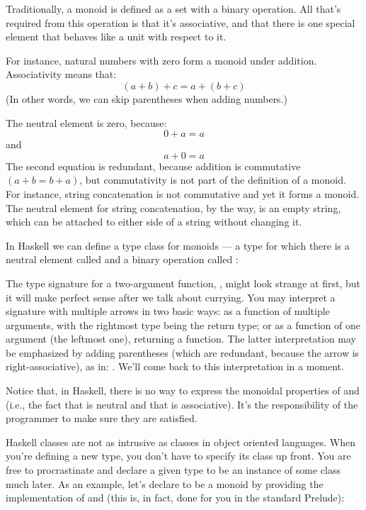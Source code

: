 Traditionally, a monoid is defined as a set with a binary operation. All
that's required from this operation is that it's associative, and that
there is one special element that behaves like a unit with respect to
it.

For instance, natural numbers with zero form a monoid under addition.
Associativity means that:
\[(a + b) + c = a + (b + c)\]
(In other words, we can skip parentheses when adding numbers.)

The neutral element is zero, because:
\[0 + a = a\]
and
\[a + 0 = a\]
The second equation is redundant, because addition is commutative $(a + b
  = b + a)$, but commutativity is not part of the definition of a monoid.
For instance, string concatenation is not commutative and yet it forms a
monoid. The neutral element for string concatenation, by the way, is an
empty string, which can be attached to either side of a string without
changing it.

In Haskell we can define a type class for monoids --- a type for which
there is a neutral element called  and a binary operation
called :

The type signature for a two-argument function,
, might look strange at first,
but it will make perfect sense after we talk about currying. You may
interpret a signature with multiple arrows in two basic ways: as a
function of multiple arguments, with the rightmost type being the return
type; or as a function of one argument (the leftmost one), returning a
function. The latter interpretation may be emphasized by adding
parentheses (which are redundant, because the arrow is
right-associative), as in: .
We'll come back to this interpretation in a moment.

Notice that, in Haskell, there is no way to express the monoidal
properties of  and  (i.e., the fact that
 is neutral and that  is associative).
It's the responsibility of the programmer to make sure they are
satisfied.

Haskell classes are not as intrusive as classes in object oriented languages.
When you're defining a new type, you don't have to specify its class up front.
You are free to procrastinate and declare a given type to be an instance of
some class much later. As an example, let's declare  to
be a monoid by providing the implementation of  and
 (this is, in fact, done for you in the standard
Prelude):

